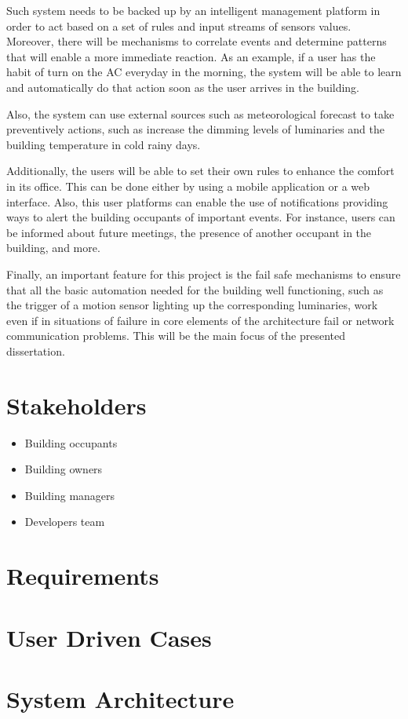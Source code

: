 Such system needs to be backed up by an intelligent management platform in order to act based on a set of rules and input streams of sensors values. Moreover, there will be mechanisms to correlate events and determine patterns that will enable a more immediate reaction. As an example, if a user has the habit of turn on the AC everyday in the morning, the system will be able to learn and automatically do that action soon as the user arrives in the building. 

Also, the system can use external sources such as meteorological forecast to take preventively actions, such as increase the dimming levels of luminaries and the building temperature in cold rainy days.

Additionally, the users will be able to set their own rules to enhance the comfort in its office. This can be done either by using a mobile application or a web interface. Also, this user platforms can enable the use of notifications providing ways to alert the building occupants of important events. For instance, users can be informed about future meetings, the presence of another occupant in the building, and more.

Finally, an important feature for this project is the fail safe mechanisms to ensure that all the basic automation needed for the building well functioning, such as the trigger of a motion sensor lighting up the corresponding luminaries, work even if in situations of failure in core elements of the architecture fail or network communication problems. This will be the main focus of the presented dissertation.


\section{Stakeholders}
\label{Architecture:Stakeholders}

\begin{itemize}
	\item Building occupants
	\item Building owners
	\item Building managers
	\item Developers team
\end{itemize}


\section{Requirements}
\label{Architecture:Requirements}

\section{User Driven Cases}
\label{Architecture:usecases}

\section{System Architecture}
\label{Architecture:Architecture}



